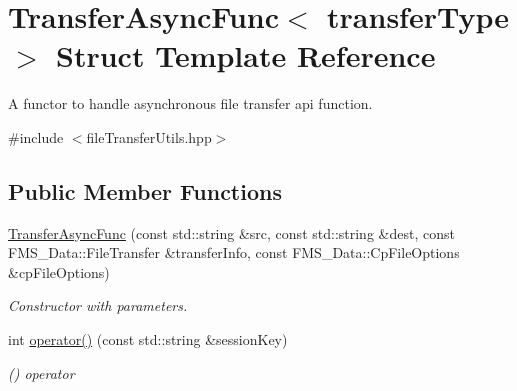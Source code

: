 \hypertarget{structTransferAsyncFunc}{
\section{TransferAsyncFunc$<$ transferType $>$ Struct Template Reference}
\label{structTransferAsyncFunc}
}


A functor to handle asynchronous file transfer api function.  




{\ttfamily \#include $<$fileTransferUtils.hpp$>$}

\subsection*{Public Member Functions}
\begin{DoxyCompactItemize}
\item 
\hyperlink{structTransferAsyncFunc_a8d8f234e085f7afd0e5f0c809273e65e}{TransferAsyncFunc} (const std::string \&src, const std::string \&dest, const FMS\_\-Data::FileTransfer \&transferInfo, const FMS\_\-Data::CpFileOptions \&cpFileOptions)
\begin{DoxyCompactList}\small\item\em Constructor with parameters. \item\end{DoxyCompactList}\item 
int \hyperlink{structTransferAsyncFunc_ac65f639acae45670544ca1694192d0b4}{operator()} (const std::string \&sessionKey)
\begin{DoxyCompactList}\small\item\em () operator \item\end{DoxyCompactList}\end{DoxyCompactItemize}
